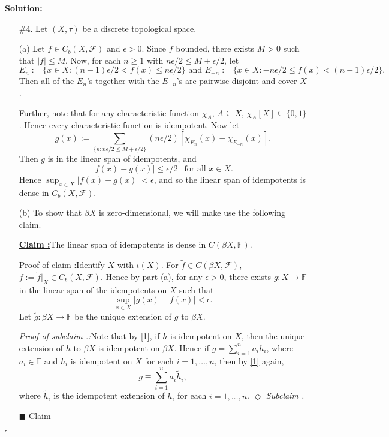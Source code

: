 \documentclass[12pt]{article}
\newcounter{ProofCounter}
\newcounter{ClaimCounter}[ProofCounter]
\newcounter{SubClaimCounter}[ClaimCounter]
\newenvironment{Solution}{\stepcounter{ProofCounter}\textbf{Solution:}}{\hfill$\square$}
\newenvironment{claim}[1]{\vspace{1mm}\stepcounter{ClaimCounter}\par\noindent\underline{\bf Claim \theClaimCounter:}\space#1}{}
\newenvironment{claimproof}[1]{\par\noindent\underline{Proof of claim \theClaimCounter:}\space#1}{\hfill $\blacksquare$ Claim \theClaimCounter}
\newenvironment{subclaim}[1]{\stepcounter{SubClaimCounter}\par\noindent\emph{Subclaim \theClaimCounter.\theSubClaimCounter:}\space#1}{}
\newenvironment{subclaimproof}[1]{\par\noindent\emph{Proof of subclaim \theClaimCounter.\theSubClaimCounter:}\space#1}{\hfill
$\Diamond$ \emph{Subclaim \theClaimCounter.\theSubClaimCounter}}
\begin{document}
\begin{Solution}
\begin{enumerate}
    \item[\#4.] Let $(X, \tau)$ be a discrete topological space.

      (a) Let $f \in C_b(X, \mathcal{F})$ and $\epsilon > 0$. Since $f$ bounded, there exists $M > 0$ such that $|f| \leq M$. Now, for each $n \geq 1$
      with $n \epsilon / 2 \leq M + \epsilon / 2$, let 
      \[
        E_n := \{ x \in X : (n - 1)\epsilon / 2 < f(x) \leq n \epsilon / 2\} \text{ and } E_{-n} := \{x \in X : -n \epsilon / 2 \leq f(x) <
        (n-1)\epsilon / 2 \}.
      \]
      Then all of the $E_n$'s together with the $E_{-n}$'s are pairwise disjoint and cover $X$.

      Further, note that for any characteristic function $\chi_A$, $A \subseteq X$, $\chi_A[X] \subseteq
      \{0,1\}$. Hence every characteristic function is idempotent. Now let 
      \[
        g(x) := \sum_{\{n : n\epsilon / 2 \leq M + \epsilon / 2\}} (n\epsilon / 2)[ \chi_{E_n}(x) - \chi_{E_{-n}}(x)].
      \]
      Then $g$ is in the linear span of idempotents, and 
      \[
        |f(x) - g(x)| \leq \epsilon / 2 \ \ \text{ for all } x \in X.
      \]
      Hence $\sup_{x \in X}|f(x) - g(x)| < \epsilon$, and so the linear span of idempotents is dense in $C_b(X, \mathcal{F})$.

      (b) To show that $\beta X$ is zero-dimensional, we will make use the following claim.
      \begin{claim}
        The linear span of idempotents is dense in $C(\beta X, \mathbb{F})$.
      \end{claim}
      \begin{claimproof}
        Identify $X$ with $\iota(X)$.
        For $\tilde{f} \in C(\beta X, \mathcal{F})$, $f := \tilde{f}\big|_{X} \in C_b(X, \mathcal{F})$. Hence by part (a), for any $\epsilon > 0$, 
        there exists $g : X \rightarrow \mathbb{F}$ in the linear span of the idempotents on $X$ such that
        \[
          \sup_{x \in X}|g(x) - f(x)| < \epsilon.
        \]
        Let $\tilde{g} : \beta X \rightarrow \mathbb{F}$ be the unique extension of $g$ to $\beta X$. 
        \begin{subclaimproof}
          Note that by \eqref{1}, if $h$ is idempotent on $X$, then the unique extension of $h$ to $\beta X$ is idempotent on $\beta X$.
          Hence if $g = \sum_{i=1}^{n}a_i h_i$, where $a_i \in \mathbb{F}$ and $h_i$ is idempotent on $X$ for each $i = 1, \dots, n$, then by \eqref{1} again,
          \[
            \tilde{g} \equiv \sum_{i=1}^{n}a_i \tilde{h}_i,
          \]
          where $\tilde{h}_i$ is the idempotent extension of $h_i$ for each $i = 1,\dots, n$.
        \end{subclaimproof}


\end{claimproof}
\end{enumerate}
\end{Solution}
\end{document}

